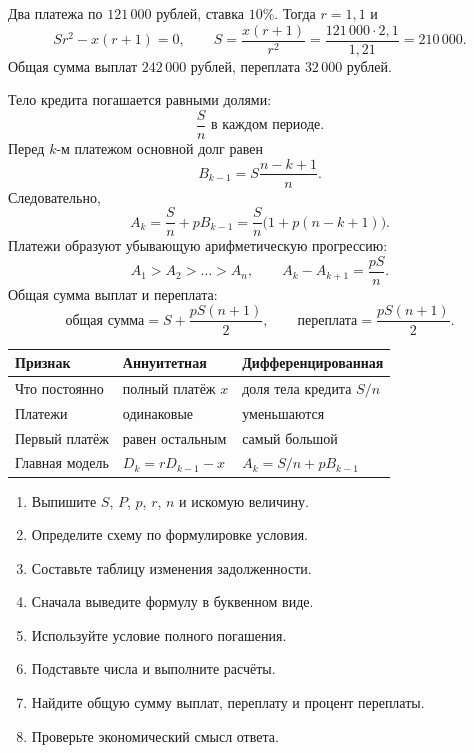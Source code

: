 \documentclass[a4paper,12pt]{article}
\newcommand{\sectiontitle}[1]{\vspace{0.4em}{\Large\bfseries\textcolor{darkaccent}{#1}}\par\vspace{0.2em}{\color{accent}\rule{\linewidth}{0.7pt}}\par\vspace{0.45em}}
\begin{document}
\sectiontitle{4. Пример аннуитетной схемы}
Два платежа по $121\,000$ рублей, ставка $10\%$. Тогда $r=1{,}1$ и
\[
Sr^2-x(r+1)=0,
\qquad
S=\frac{x(r+1)}{r^2}=\frac{121\,000\cdot2{,}1}{1{,}21}=210\,000.
\]
Общая сумма выплат $242\,000$ рублей, переплата $32\,000$ рублей.

\sectiontitle{5. Дифференцированная схема}
Тело кредита погашается равными долями:
\[
\boxed{\frac{S}{n}\text{ в каждом периоде}}.
\]
Перед $k$-м платежом основной долг равен
\[
B_{k-1}=S\frac{n-k+1}{n}.
\]
Следовательно,
\[
\boxed{A_k=\frac{S}{n}+pB_{k-1}=\frac{S}{n}\bigl(1+p(n-k+1)\bigr)}.
\]
Платежи образуют убывающую арифметическую прогрессию:
\[
A_1>A_2>\dots>A_n,
\qquad
A_k-A_{k+1}=\frac{pS}{n}.
\]
Общая сумма выплат и переплата:
\[
\boxed{\text{общая сумма}=S+\frac{pS(n+1)}{2}},
\qquad
\boxed{\text{переплата}=\frac{pS(n+1)}{2}}.
\]

\sectiontitle{6. Сравнение схем}
\begin{table}[h]\centering
\begin{tabularx}{\linewidth}{@{}lXX@{}}\toprule
Признак & Аннуитетная & Дифференцированная\\\midrule
Что постоянно & полный платёж $x$ & доля тела кредита $S/n$\\
Платежи & одинаковые & уменьшаются\\
Первый платёж & равен остальным & самый большой\\
Главная модель & $D_k=rD_{k-1}-x$ & $A_k=S/n+pB_{k-1}$\\\bottomrule
\end{tabularx}\end{table}

\sectiontitle{7. Алгоритм решения}
\begin{enumerate}[leftmargin=2em,itemsep=0.3em]
\item Выпишите $S$, $P$, $p$, $r$, $n$ и искомую величину.
\item Определите схему по формулировке условия.
\item Составьте таблицу изменения задолженности.
\item Сначала выведите формулу в буквенном виде.
\item Используйте условие полного погашения.
\item Подставьте числа и выполните расчёты.
\item Найдите общую сумму выплат, переплату и процент переплаты.
\item Проверьте экономический смысл ответа.
\end{enumerate}
\end{document}
